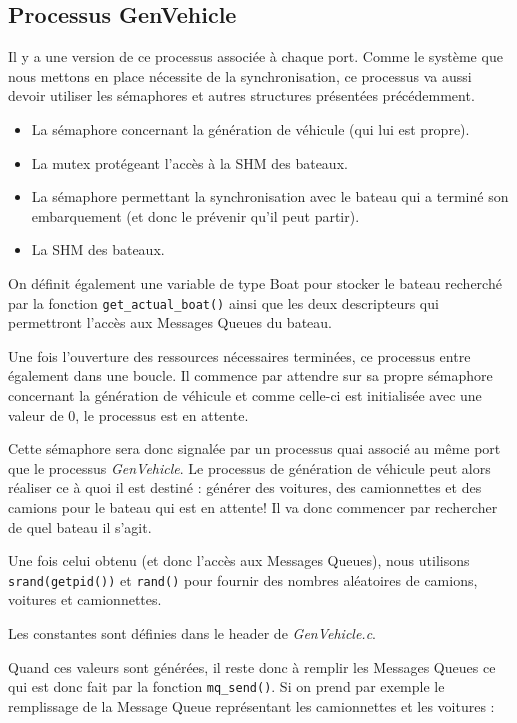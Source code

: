 \documentclass[a4paper, 11pt]{article}
\begin{document}
	\subsection{Processus GenVehicle}
		Il y a une version de ce processus associée à chaque port. Comme le système que nous mettons en place nécessite de la synchronisation, ce processus va aussi devoir utiliser les sémaphores et autres structures présentées précédemment.
		\begin{itemize}
			\item La sémaphore concernant la génération de véhicule (qui lui est propre).
			\item La mutex protégeant l'accès à la SHM des bateaux.
			\item La sémaphore permettant la synchronisation avec le bateau qui a terminé son embarquement (et donc le prévenir qu'il peut partir).
			\item La SHM des bateaux.
		\end{itemize}
		On définit également une variable de type Boat pour stocker le bateau recherché par la fonction \texttt{get\_actual\_boat()} ainsi que les deux descripteurs qui permettront l'accès aux Messages Queues du bateau.
		
		Une fois l'ouverture des ressources nécessaires terminées, ce processus entre également dans une boucle. Il commence par attendre sur sa propre sémaphore concernant la génération de véhicule et comme celle-ci est initialisée avec une valeur de 0, le processus est en attente. 
		
		Cette sémaphore sera donc signalée par un processus quai associé au même port que le processus \textit{GenVehicle}. Le processus de génération de véhicule peut alors réaliser ce à quoi il est destiné : générer des voitures, des camionnettes et des camions pour le bateau qui est en attente! Il va donc commencer par rechercher de quel bateau il s'agit. 
		
		Une fois celui obtenu (et donc l'accès aux Messages Queues), nous utilisons \texttt{srand(getpid())} et \texttt{rand()} pour fournir des nombres aléatoires de camions, voitures et camionnettes.
		
		Les constantes sont définies dans le header de \textit{GenVehicle.c}.
		
		Quand ces valeurs sont générées, il reste donc à remplir les Messages Queues ce qui est donc fait par la fonction \texttt{mq\_send()}. Si on prend par exemple le remplissage de la Message Queue représentant les camionnettes et les voitures :
\end{document}
